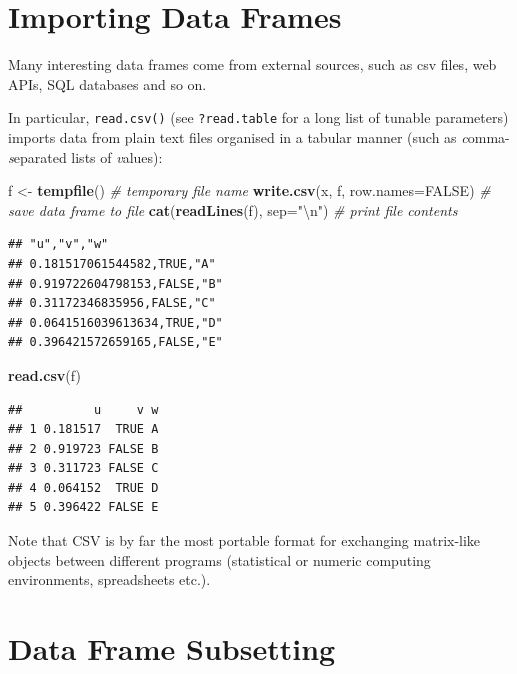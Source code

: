 \documentclass[10pt,b5paper,krantz1]{krantz}
\newenvironment{Shaded}{\begin{snugshade}}{\end{snugshade}}
\newcommand{\CharTok}[1]{\textcolor[rgb]{0.5,0.5,0.5}{#1}}
\newcommand{\CommentTok}[1]{\textcolor[rgb]{0.37,0.37,0.37}{\textit{#1}}}
\newcommand{\DataTypeTok}[1]{\textcolor[rgb]{0.27,0.27,0.27}{#1}}
\newcommand{\KeywordTok}[1]{\textcolor[rgb]{0.27,0.27,0.27}{\textbf{#1}}}
\newcommand{\NormalTok}[1]{#1}
\newcommand{\OtherTok}[1]{\textcolor[rgb]{0.37,0.37,0.37}{#1}}
\newcommand{\StringTok}[1]{\textcolor[rgb]{0.5,0.5,0.5}{#1}}
\begin{document}
\hypertarget{importing-data-frames}{%
\section{Importing Data Frames}\label{importing-data-frames}}

Many interesting data frames come from external sources, such as csv files,
web APIs, SQL databases and so on.

In particular, \texttt{read.csv()} (see \texttt{?read.table} for a long list
of tunable parameters) imports data from plain text files
organised in a tabular manner (such as \emph{c}omma-\emph{s}eparated lists of \emph{v}alues):

\begin{Shaded}
\begin{Highlighting}[]
\NormalTok{f <-}\StringTok{ }\KeywordTok{tempfile}\NormalTok{() }\CommentTok{# temporary file name}
\KeywordTok{write.csv}\NormalTok{(x, f, }\DataTypeTok{row.names=}\OtherTok{FALSE}\NormalTok{) }\CommentTok{# save data frame to file}
\KeywordTok{cat}\NormalTok{(}\KeywordTok{readLines}\NormalTok{(f), }\DataTypeTok{sep=}\StringTok{"}\CharTok{\textbackslash{}n}\StringTok{"}\NormalTok{) }\CommentTok{# print file contents}
\end{Highlighting}
\end{Shaded}

\begin{verbatim}
## "u","v","w"
## 0.181517061544582,TRUE,"A"
## 0.919722604798153,FALSE,"B"
## 0.31172346835956,FALSE,"C"
## 0.0641516039613634,TRUE,"D"
## 0.396421572659165,FALSE,"E"
\end{verbatim}

\begin{Shaded}
\begin{Highlighting}[]
\KeywordTok{read.csv}\NormalTok{(f)}
\end{Highlighting}
\end{Shaded}

\begin{verbatim}
##          u     v w
## 1 0.181517  TRUE A
## 2 0.919723 FALSE B
## 3 0.311723 FALSE C
## 4 0.064152  TRUE D
## 5 0.396422 FALSE E
\end{verbatim}

Note that CSV is by far the most portable format for exchanging matrix-like
objects between different programs (statistical or numeric computing
environments, spreadsheets etc.).

\hypertarget{data-frame-subsetting}{%
\section{Data Frame Subsetting}\label{data-frame-subsetting}}
\end{document}

